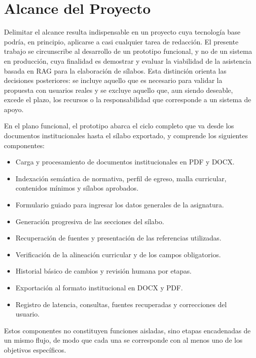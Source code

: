 \section{Alcance del Proyecto}
Delimitar el alcance resulta indispensable en un proyecto cuya tecnología base podría, en principio, aplicarse a casi cualquier tarea de redacción. El presente trabajo se circunscribe al desarrollo de un prototipo funcional, y no de un sistema en producción, cuya finalidad es demostrar y evaluar la viabilidad de la asistencia basada en RAG para la elaboración de sílabos. Esta distinción orienta las decisiones posteriores: se incluye aquello que es necesario para validar la propuesta con usuarios reales y se excluye aquello que, aun siendo deseable, excede el plazo, los recursos o la responsabilidad que corresponde a un sistema de apoyo.

En el plano funcional, el prototipo abarca el ciclo completo que va desde los documentos institucionales hasta el sílabo exportado, y comprende los siguientes componentes:
\begin{itemize}
  \item Carga y procesamiento de documentos institucionales en PDF y DOCX.
  \item Indexación semántica de normativa, perfil de egreso, malla curricular, contenidos mínimos y sílabos aprobados.
  \item Formulario guiado para ingresar los datos generales de la asignatura.
  \item Generación progresiva de las secciones del sílabo.
  \item Recuperación de fuentes y presentación de las referencias utilizadas.
  \item Verificación de la alineación curricular y de los campos obligatorios.
  \item Historial básico de cambios y revisión humana por etapas.
  \item Exportación al formato institucional en DOCX y PDF.
  \item Registro de latencia, consultas, fuentes recuperadas y correcciones del usuario.
\end{itemize}
Estos componentes no constituyen funciones aisladas, sino etapas encadenadas de un mismo flujo, de modo que cada una se corresponde con al menos uno de los objetivos específicos.

